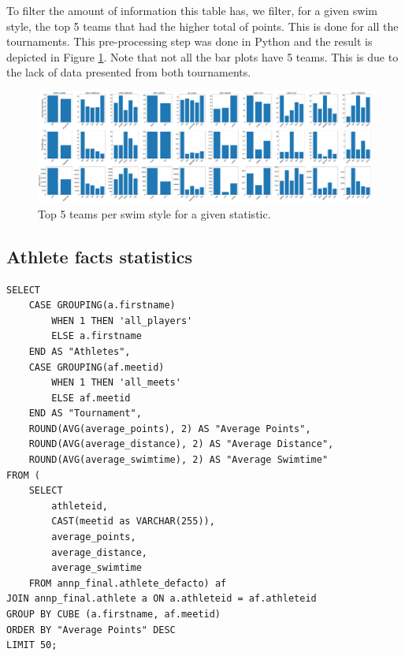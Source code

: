 To filter the amount of information this table has, we filter, for a given swim style, the top 5 teams that had the higher total of points. This is done for all the
tournaments. This pre-processing step was done in Python and the result is depicted in Figure \ref{fig:clubs_fact2}. Note that not all the bar plots have 5 teams. This
is due to the lack of data presented from both tournaments.

\begin{figure}[H]
    \centering
    \includegraphics[width=\textwidth]{img/stats_clubs_swim.pdf}
    \caption{Top 5 teams per swim style for a given statistic.}
    \label{fig:clubs_fact2}
\end{figure}

\subsection{Athlete facts statistics}

\begin{verbatim}
SELECT
    CASE GROUPING(a.firstname)
        WHEN 1 THEN 'all_players'
        ELSE a.firstname
    END AS "Athletes",
    CASE GROUPING(af.meetid)
        WHEN 1 THEN 'all_meets'
        ELSE af.meetid
    END AS "Tournament",
    ROUND(AVG(average_points), 2) AS "Average Points",
    ROUND(AVG(average_distance), 2) AS "Average Distance",
    ROUND(AVG(average_swimtime), 2) AS "Average Swimtime"
FROM (
    SELECT
        athleteid,
        CAST(meetid as VARCHAR(255)),
        average_points,
        average_distance,
        average_swimtime
    FROM annp_final.athlete_defacto) af
JOIN annp_final.athlete a ON a.athleteid = af.athleteid
GROUP BY CUBE (a.firstname, af.meetid)
ORDER BY "Average Points" DESC
LIMIT 50;
\end{verbatim}


